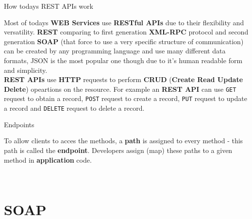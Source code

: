 How todays REST APIs work

Most of todays \textbf{WEB Services} use \textbf{RESTful APIs} due to their flexibility and versatility. \textbf{REST} comparing to first generation \textbf{XML-RPC} protocol and second generation \textbf{SOAP} (that force to use a very specific structure of communication)	can be created by any programming language and use many different data formats, JSON is the most popular one though due to it's human readable form and simplicity.\\

\textbf{REST APIs} use \textbf{HTTP} requests to perform \textbf{CRUD} (\textbf{Create Read Update Delete}) opeartions on the resource. For example an \textbf{REST API} can use \texttt{GET} request to obtain a record, \texttt{POST} request to create a record, \texttt{PUT} request to update a record and \texttt{DELETE} request to delete a record.

Endpoints

To allow clients to acces the methods, a \textbf{path} is assigned to every method - this path is called the \textbf{endpoint}. Developers assign (map) these paths to a given method in \textbf{application} code.

\fbox{\textcolor{red}{Extract glossary entries}}\\

\section{SOAP}

\fbox{\textcolor{red}{populate with content}}\\

